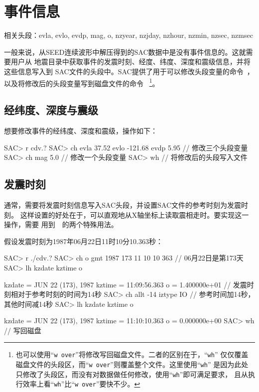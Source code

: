 \section{事件信息}
\label{sec:event-info}
相关头段：evla, evlo, evdp, mag, o, nzyear, nzjday, nzhour, nzmin, nzsec, nzmsec

一般来说，从SEED连续波形中解压得到的SAC数据中是没有事件信息的。这就需要用户从
地震目录中获取事件的发震时刻、经度、纬度、深度和震级信息，并将这些信息写入到
SAC文件的头段中。SAC提供了用于可以修改头段变量的命令~，
以及将修改后的头段变量写到磁盘文件的命令~
\footnote{
也可以使用``\verb+w over+''将修改写回磁盘文件。二者的区别在于，``\verb+wh+''
仅仅覆盖磁盘文件的头段区，而``\verb+w over+''则覆盖整个文件。这里使用``\verb+wh+''
是因为此处只修改了头段区，而没有对数据做任何修改，使用``\verb+wh+''即可满足要求，
且从执行效率上看``\verb+wh+''比``\verb+w over+''要快不少。}。

\subsection{经纬度、深度与震级}
想要修改事件的经纬度、深度和震级，操作如下：
\begin{SACCode}
SAC> r cdv.?
SAC> ch evla 37.52 evlo -121.68 evdp 5.95   // 修改三个头段变量
SAC> ch mag 5.0                             // 修改一个头段变量
SAC> wh                                     // 将修改后的头段写入文件
\end{SACCode}

\subsection{发震时刻}
通常，需要将发震时刻信息写入SAC头段，并设置SAC文件的参考时刻为发震时刻。
这样设置的好处在于，可以直观地从X轴坐标上读取震相走时。要实现这一操作，需要
用到~~的两个特殊用法。

假设发震时刻为1987年06月22日11时10分10.363秒：
\label{code:origin-time}
\begin{SACCode}
SAC> r ./cdv.?
SAC> ch o gmt 1987 173 11 10 10 363   // 06月22日是第173天
SAC> lh kzdate kztime o

     kzdate = JUN 22 (173), 1987
     kztime = 11:09:56.363
          o = 1.400000e+01       // 发震时刻相对于参考时刻的时间为14秒
SAC> ch allt -14 iztype IO       // 参考时间加14秒，其他时间减14秒
SAC> lh kzdate kztime o

     kzdate = JUN 22 (173), 1987
     kztime = 11:10:10.363
          o = 0.000000e+00
SAC> wh                          // 写回磁盘
\end{SACCode}

